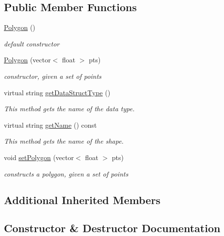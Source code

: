 \subsection*{Public Member Functions}
\begin{DoxyCompactItemize}
\item 
\hyperlink{classbridges_1_1datastructure_1_1_polygon_aed5756ee817adaadbff1b8e9702cbb42}{Polygon} ()
\begin{DoxyCompactList}\small\item\em default constructor \end{DoxyCompactList}\item 
\hyperlink{classbridges_1_1datastructure_1_1_polygon_a38759163e7b80c2e1582629354371ac5}{Polygon} (vector$<$ float $>$ pts)
\begin{DoxyCompactList}\small\item\em constructor, given a set of points \end{DoxyCompactList}\item 
virtual string \hyperlink{classbridges_1_1datastructure_1_1_polygon_aa5a4897e1e0818b8e786b6ddaf81230e}{get\+Data\+Struct\+Type} ()
\begin{DoxyCompactList}\small\item\em This method gets the name of the data type. \end{DoxyCompactList}\item 
virtual string \hyperlink{classbridges_1_1datastructure_1_1_polygon_a9e11131b2a1f3b6044913577f51546c3}{get\+Name} () const
\begin{DoxyCompactList}\small\item\em This method gets the name of the shape. \end{DoxyCompactList}\item 
void \hyperlink{classbridges_1_1datastructure_1_1_polygon_a058a8ec2340f15f45dab27b18978055c}{set\+Polygon} (vector$<$ float $>$ pts)
\begin{DoxyCompactList}\small\item\em constructs a polygon, given a set of points \end{DoxyCompactList}\end{DoxyCompactItemize}
\subsection*{Additional Inherited Members}


\subsection{Constructor \& Destructor Documentation}
\mbox{\label{classbridges_1_1datastructure_1_1_polygon_aed5756ee817adaadbff1b8e9702cbb42}} 
